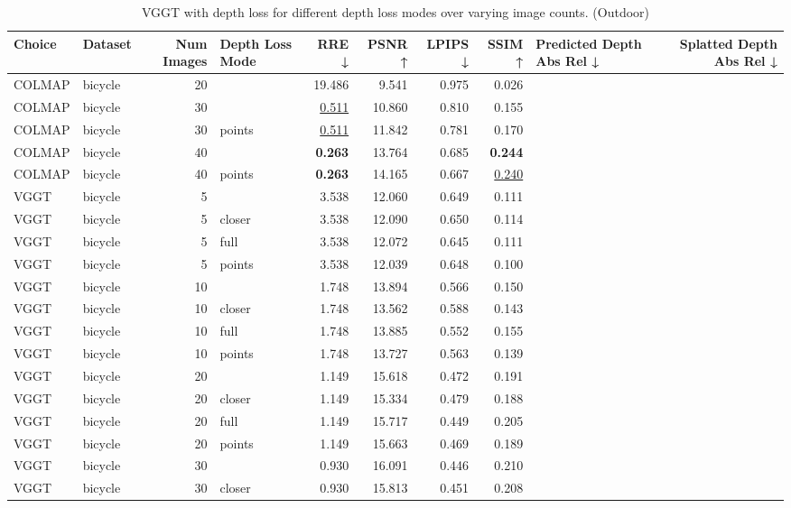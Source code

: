 \begin{table}[H]
\caption{VGGT with depth loss for different depth loss modes over varying image counts. (Outdoor)}
\label{tab:05_depth_loss_num_images_outdoor}
\centering
\scriptsize
\begin{tabular}{llrlrrrrlr}
\toprule
Choice & Dataset & Num Images & Depth Loss Mode & RRE ↓ & PSNR ↑ & LPIPS ↓ & SSIM ↑ & Predicted Depth Abs Rel ↓ & Splatted Depth Abs Rel ↓ \\
\midrule
COLMAP & bicycle & 20 &  & 19.486 & 9.541 & 0.975 & 0.026 &  &  \\
COLMAP & bicycle & 30 &  & \underline{0.511} & 10.860 & 0.810 & 0.155 &  &  \\
COLMAP & bicycle & 30 & points & \underline{0.511} & 11.842 & 0.781 & 0.170 &  &  \\
COLMAP & bicycle & 40 &  & \textbf{0.263} & 13.764 & 0.685 & \textbf{0.244} &  &  \\
COLMAP & bicycle & 40 & points & \textbf{0.263} & 14.165 & 0.667 & \underline{0.240} &  &  \\
VGGT & bicycle & 5 &  & 3.538 & 12.060 & 0.649 & 0.111 &  &  \\
VGGT & bicycle & 5 & closer & 3.538 & 12.090 & 0.650 & 0.114 &  &  \\
VGGT & bicycle & 5 & full & 3.538 & 12.072 & 0.645 & 0.111 &  &  \\
VGGT & bicycle & 5 & points & 3.538 & 12.039 & 0.648 & 0.100 &  &  \\
VGGT & bicycle & 10 &  & 1.748 & 13.894 & 0.566 & 0.150 &  &  \\
VGGT & bicycle & 10 & closer & 1.748 & 13.562 & 0.588 & 0.143 &  &  \\
VGGT & bicycle & 10 & full & 1.748 & 13.885 & 0.552 & 0.155 &  &  \\
VGGT & bicycle & 10 & points & 1.748 & 13.727 & 0.563 & 0.139 &  &  \\
VGGT & bicycle & 20 &  & 1.149 & 15.618 & 0.472 & 0.191 &  &  \\
VGGT & bicycle & 20 & closer & 1.149 & 15.334 & 0.479 & 0.188 &  &  \\
VGGT & bicycle & 20 & full & 1.149 & 15.717 & 0.449 & 0.205 &  &  \\
VGGT & bicycle & 20 & points & 1.149 & 15.663 & 0.469 & 0.189 &  &  \\
VGGT & bicycle & 30 &  & 0.930 & 16.091 & 0.446 & 0.210 &  &  \\
VGGT & bicycle & 30 & closer & 0.930 & 15.813 & 0.451 & 0.208 &  &  \\

\end{tabular}
\end{table}
